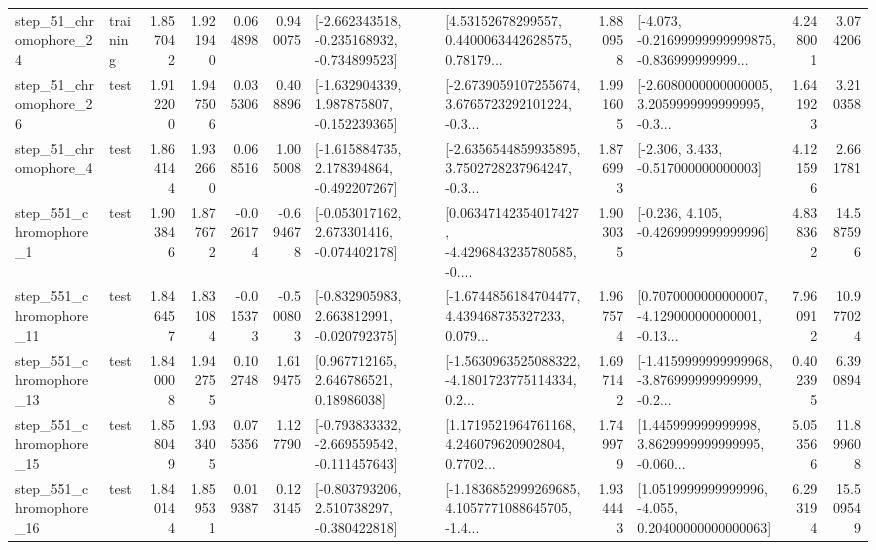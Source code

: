 \begin{tabular}{llrrrrllrlrr}
   step\_51\_chromophore\_24 &  training &      1.857042 &    1.921940 &      0.064898 &  0.940075 &  [-2.662343518, -0.235168932, -0.734899523] &  [4.53152678299557, 0.4400063442628575, 0.78179... &       1.880958 &  [-4.073, -0.21699999999999875, -0.836999999999... &            4.248001 &          3.074206 \\
   step\_51\_chromophore\_26 &      test &      1.912200 &    1.947506 &      0.035306 &  0.408896 &   [-1.632904339, 1.987875807, -0.152239365] &  [-2.6739059107255674, 3.6765723292101224, -0.3... &       1.991605 &  [-2.6080000000000005, 3.2059999999999995, -0.3... &            1.641923 &          3.210358 \\
    step\_51\_chromophore\_4 &      test &      1.864144 &    1.932660 &      0.068516 &  1.005008 &   [-1.615884735, 2.178394864, -0.492207267] &  [-2.6356544859935895, 3.7502728237964247, -0.3... &       1.876993 &                [-2.306, 3.433, -0.517000000000003] &            4.121596 &          2.661781 \\
   step\_551\_chromophore\_1 &      test &      1.903846 &    1.877672 &     -0.026174 & -0.694678 &   [-0.053017162, 2.673301416, -0.074402178] &  [0.06347142354017427, -4.4296843235780585, -0.... &       1.903035 &               [-0.236, 4.105, -0.4269999999999996] &            4.838362 &         14.587596 \\
  step\_551\_chromophore\_11 &      test &      1.846457 &    1.831084 &     -0.015373 & -0.500803 &   [-0.832905983, 2.663812991, -0.020792375] &  [-1.6744856184704477, 4.439468735327233, 0.079... &       1.967574 &  [0.7070000000000007, -4.129000000000001, -0.13... &            7.960912 &         10.977024 \\
  step\_551\_chromophore\_13 &      test &      1.840008 &    1.942755 &      0.102748 &  1.619475 &      [0.967712165, 2.646786521, 0.18986038] &  [-1.5630963525088322, -4.1801723775114334, 0.2... &       1.697142 &  [-1.4159999999999968, -3.876999999999999, -0.2... &            0.402395 &          6.390894 \\
  step\_551\_chromophore\_15 &      test &      1.858049 &    1.933405 &      0.075356 &  1.127790 &  [-0.793833332, -2.669559542, -0.111457643] &  [1.1719521964761168, 4.246079620902804, 0.7702... &       1.749979 &  [1.445999999999998, 3.8629999999999995, -0.060... &            5.053566 &         11.899608 \\
  step\_551\_chromophore\_16 &      test &      1.840144 &    1.859531 &      0.019387 &  0.123145 &   [-0.803793206, 2.510738297, -0.380422818] &  [-1.1836852999269685, 4.1057771088645705, -1.4... &       1.934443 &  [1.0519999999999996, -4.055, 0.20400000000000063] &            6.293194 &         15.509549 \\

\end{tabular}
